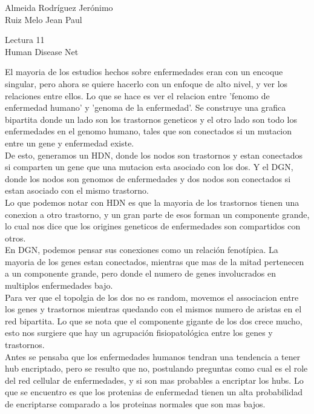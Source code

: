 \documentclass[a4paper, 12pt]{report}
\begin{document}
\begin{flushright}
    Almeida Rodríguez Jerónimo\\
    Ruiz Melo Jean Paul
\end{flushright}

\begin{center}
    {\LARGE Lectura 11}\\
    {\LARGE Human Disease Net}
\end{center}
El mayoria de los estudios hechos sobre enfermedades eran con un encoque singular,
pero ahora se quiere hacerlo con un enfoque de alto nivel, y ver los relaciones entre
ellos. Lo que se hace es ver el relacion entre 'fenomo de enfermedad humano' y
'genoma de la enfermedad'. Se construye una grafica bipartita donde un lado
son los trastornos geneticos y el otro lado son todo los enfermedades en el
genomo humano, tales que son conectados si un mutacion entre un gene y enfermedad
existe.  \\

De esto, generamos un HDN, donde los nodos son trastornos y estan conectados
si comparten un gene que una mutacion esta asociado con los dos. Y el DGN,
donde los nodos son genomos de enfermedades y dos nodos son conectados
si estan asociado con el mismo trastorno. \\

Lo que podemos notar con HDN es que la mayoria de los trastornos tienen una conexion
a otro trastorno, y un gran parte de esos forman un componente grande, lo cual
nos dice que los origines geneticos de enfermedades son compartidos con otros.  \\

En DGN, podemos pensar sus conexiones como un relación fenotípica. La mayoria
de los genes estan conectados, mientras que mas de la mitad pertenecen a un
componente grande, pero donde el numero de genes involucrados en multiplos
enfermedades bajo. \\

Para ver que el topolgia de los dos no es random, movemos el associacion entre
los genes y trastornos mientras quedando con el mismos numero de aristas en
el red bipartita. Lo que se nota que el componente gigante de los dos crece mucho,
esto nos surgiere que hay un agrupación fisiopatológica entre los genes y
trastornos. \\

Antes se pensaba que los enfermedades humanos tendran una tendencia a tener
hub encriptado, pero se resulto que no, postulando preguntas como cual es el
role del red cellular de enfermedades, y si son mas probables a encriptar
los hubs. Lo que se encuentro es que los protenias de enfermedad tienen un alta probabilidad
de encriptarse comparado a los proteinas normales que son mas bajos.
\\
\end{document}
